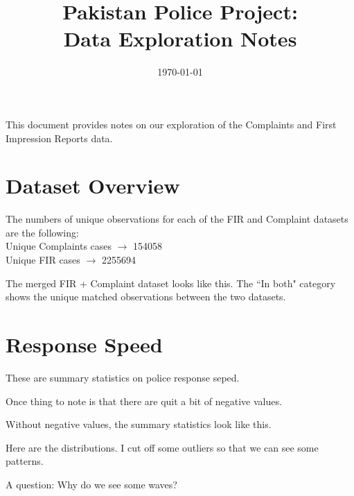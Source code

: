 \documentclass[11pt]{article}
\title{Pakistan Police Project: \\ Data Exploration Notes}
\date{\today}
\begin{document}
	
\maketitle

This document provides notes on our exploration of the Complaints and First Impression Reports data.

\section{Dataset Overview}

The numbers of unique observations for each of the FIR and Complaint datasets are the following: \\
\noindent Unique Complaints cases $\rightarrow$  154058 \\
\noindent Unique FIR cases $\rightarrow$ 2255694

The merged FIR + Complaint dataset looks like this. The ``In both" category shows the unique matched observations between the two datasets.



\section{Response Speed}

These are summary statistics on police response seped. 

Once thing to note is that there are quit a bit of negative values. 

	
	
Without negative values, the summary statistics look like this.

	
	

Here are the distributions. I cut off some outliers so that we can see some patterns. 

A question: Why do we see some waves? 
\end{document}
